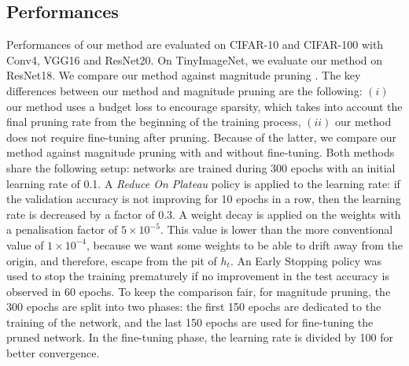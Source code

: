 
\subsection{Performances}
\label{sec:chap1:performances}
Performances of our method are evaluated on CIFAR-10 and CIFAR-100 with Conv4,
VGG16 and ResNet20. On TinyImageNet, we evaluate our method on ResNet18. We
compare our method against magnitude pruning \cite{DBLP:conf/nips/HanPTD15}. The
key differences between our method and magnitude pruning are the following:
$(i)$ our method uses a budget loss to encourage sparsity, which takes into
account the final pruning rate from the beginning of the training process,
$(ii)$ our method does not require fine-tuning after pruning. Because of the
latter, we compare our method against magnitude pruning with and without
fine-tuning. Both methods share the following setup: networks are trained during
300 epochs with an initial learning rate of 0.1. A {\em Reduce On Plateau}
policy is applied to the learning rate: if the validation accuracy is not
improving for 10 epochs in a row, then the learning rate is decreased by a
factor of 0.3. A weight decay is applied on the weights with a penalisation
factor of $5\times10^{−5}$. This value is lower than the more conventional value
of $1\times10^{-4}$, because we want some weights to be able to drift away from the
origin, and therefore, escape from the pit of $h_t$. An Early Stopping policy was
used to stop the training prematurely if no improvement in the test accuracy is
observed in 60 epochs. To keep the comparison fair, for magnitude pruning, the
300 epochs are split into two phases: the first 150 epochs are dedicated to the
training of the network, and the last 150 epochs are used for fine-tuning the
pruned network. In the fine-tuning phase, the learning rate is divided by 100
for better convergence. \\

